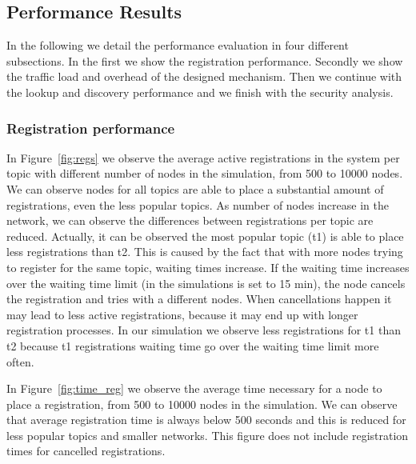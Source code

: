 \iffalse
\subsection{Performance Results}

In the following we detail the performance evaluation in four different subsections.  In the first we show the registration performance.  Secondly we show the traffic load and overhead of the designed mechanism.  Then we continue with the lookup and discovery performance and we finish with the security analysis.

\subsubsection{Registration  performance}

In Figure~\ref{fig:regs} we observe the average active registrations in the system per topic with different number of nodes in the simulation,  from 500 to 10000 nodes. 
We can observe nodes for all topics are able to place a substantial amount of registrations, even the less popular topics. 
As number of nodes increase in the network, we can observe the differences between registrations per topic are reduced. 
Actually, it can be observed the most popular topic (t1) is able to place less registrations than t2. 
This is caused by the fact that with more nodes trying to register for the same topic,  waiting times increase.
If the waiting time increases over the waiting time limit (in the simulations is set to 15 min),  the node cancels the registration and tries with a different nodes.
When cancellations happen it may lead to less active registrations, because it may end up with longer registration processes.
In our simulation we observe less registrations for t1 than t2  because t1 registrations waiting time go over the waiting time limit more often.

In Figure~\ref{fig:time_reg} we observe the average time necessary for a node to place a registration,  from 500 to 10000 nodes in the simulation.
We can observe that average registration time is always below 500 seconds and this is reduced for less popular topics and smaller networks. 
This figure does not include registration times for cancelled registrations.


